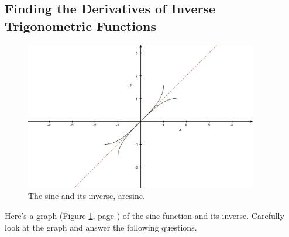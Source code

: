 \documentclass[12pt,addpoints, answers, fleqn]{exam}
\begin{document}
\subsection{Finding the Derivatives of Inverse Trigonometric Functions}
\begin{figure}[htbp] %
   \centering
   \includegraphics[width=4in]{./graphics/graph1602.pdf} 
   \caption{The sine and its inverse, arcsine.}
   \label{fig:graph1602}
\end{figure}
Here's a graph (Figure \ref{fig:graph1602}, page \pageref{fig:graph1602}) of the sine function and its inverse. Carefully look at the graph and answer the following questions.
\end{document}

